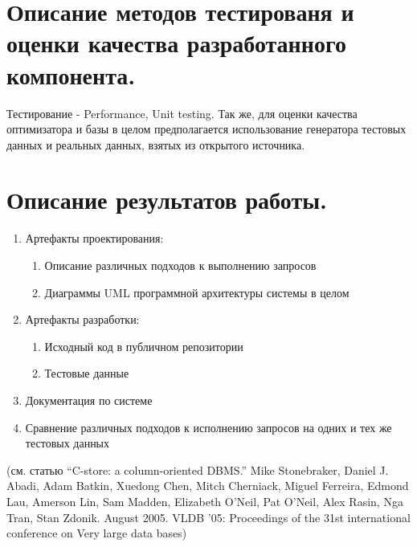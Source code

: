 \documentclass[12pt]{article}
\begin{document}
    \section{Описание методов тестированя и оценки качества разработанного компонента.}
        Тестирование - Performance, Unit testing. Так же, для оценки качества оптимизатора и базы в целом предполагается использование генератора тестовых данных и реальных данных, взятых из открытого источника.
    \section{Описание результатов работы.}
        \begin{enumerate}\itemsep1pt \parskip0pt 
        	\item Артефакты проектирования:
            	\begin{enumerate}\itemsep1pt \parskip0pt 
            	    \item Описание различных подходов к выполнению запросов
            	    \item Диаграммы UML программной архитектуры системы в целом
            	\end{enumerate}
        	\item Артефакты разработки:
            	\begin{enumerate}\itemsep1pt \parskip0pt 
            	    \item Исходный код в публичном репозитории
            	    \item Тестовые данные
            	\end{enumerate}
    	    \item Документация по системе
    	    \item Сравнение различных подходов к исполнению запросов на одних и тех же тестовых данных
        \end{enumerate}



        (см. статью ``C-store: a column-oriented DBMS.'' Mike Stonebraker, Daniel J. Abadi, Adam Batkin, Xuedong Chen, Mitch Cherniack, Miguel Ferreira, Edmond Lau, Amerson Lin, Sam Madden, Elizabeth O'Neil, Pat O'Neil, Alex Rasin, Nga Tran, Stan Zdonik. August 2005. VLDB '05: Proceedings of the 31st international conference on Very large data bases)
\end{document}
